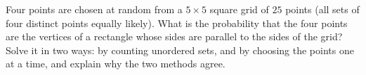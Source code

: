 Four points are chosen at random from a $5\times5$ square grid of $25$ points (all sets of four distinct points equally likely). What is the probability that the four points are the vertices of a rectangle whose sides are parallel to the sides of the grid? Solve it in two ways: by counting unordered sets, and by choosing the points one at a time, and explain why the two methods agree.
